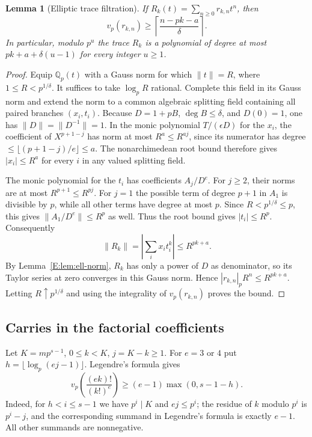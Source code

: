 \documentclass[11pt,a4paper]{article}
\newtheorem{lemma}[theorem]{Lemma}
\theoremstyle{definition}\newtheorem{definition}[theorem]{Definition}
\theoremstyle{remark}\newtheorem{remark}[theorem]{Remark}
\numberwithin{equation}{section}
\begin{document}
\begin{lemma}[Elliptic trace filtration]\label{E:lem:ell-filtration}
If $R_k(t)=\sum_{n\geq0}r_{k,n}t^n$, then
\[
 v_p(r_{k,n})\geq
 \left\lceil\frac{n-pk-a}{\delta}\right\rceil.
\]
In particular, modulo $p^u$ the trace $R_k$ is a polynomial of degree
at most $pk+a+\delta(u-1)$ for every integer $u\geq1$.
\end{lemma}

\begin{proof}
Equip $\mathbb Q_p(t)$ with a Gauss norm for which $\lVert t\rVert=R$,
where $1\leq R<p^{1/\delta}$.  It suffices to take $\log_pR$ rational.
Complete this field in its Gauss norm and extend the norm to a common
algebraic splitting field containing all paired branches $(x_i,t_i)$.
Because $D=1+pB$, $\deg B\leq\delta$, and $D(0)=1$, one has
$\lVert D\rVert=\lVert D^{-1}\rVert=1$.  In the monic polynomial
$T/(\epsilon D)$ for the $x_i$, the coefficient of $X^{p+1-j}$ has
norm at most $R^a\leq R^{aj}$, since its numerator has degree
$\leq\lfloor(p+1-j)/e\rfloor\leq a$.  The nonarchimedean root bound
therefore gives $|x_i|\leq R^a$ for every $i$ in any valued splitting
field.

The monic polynomial for the $t_i$ has coefficients $A_j/D^e$.
For $j\geq2$, their norms are at most $R^{p+1}\leq R^{pj}$.
For $j=1$ the possible term of degree $p+1$ in $A_1$ is divisible
by $p$, while all other terms have degree at most $p$.
Since $R<p^{1/\delta}\leq p$, this gives
$\lVert A_1/D^e\rVert\leq R^p$ as well.  Thus the root bound gives
$|t_i|\leq R^p$.  Consequently
\[
 \lVert R_k\rVert=\left|\sum_i x_it_i^k\right|
     \leq R^{pk+a}.
\]
By Lemma~\ref{E:lem:ell-norm}, $R_k$ has only a power of $D$ as
denominator, so its Taylor series at zero converges in this Gauss
norm.  Hence $|r_{k,n}|_pR^n\leq R^{pk+a}$.
Letting $R\uparrow p^{1/\delta}$ and using the integrality of
$v_p(r_{k,n})$ proves the bound.
\end{proof}

\subsection{Carries in the factorial coefficients}

Let $K=mp^{s-1}$, $0\leq k<K$, $j=K-k\geq1$.
For $e=3$ or $4$ put $h=\lfloor\log_p(ej-1)\rfloor$.
Legendre's formula gives
\begin{equation}\label{E:eq:ell-carry}
 v_p\left(\frac{(ek)!}{(k!)^e}\right)
 \geq(e-1)\max(0,s-1-h).
\end{equation}
Indeed, for $h<i\leq s-1$ we have $p^i\mid K$ and $ej\leq p^i$;
the residue of $k$ modulo $p^i$ is $p^i-j$, and the corresponding
summand in Legendre's formula is exactly $e-1$.  All other summands
are nonnegative.
\end{document}
